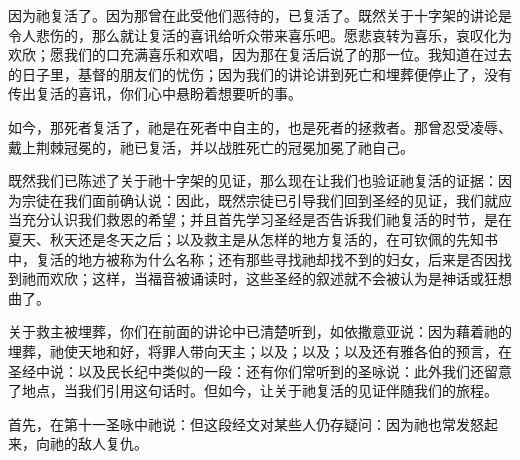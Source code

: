 \par

因为祂复活了。因为那曾在此受他们恶待的，已复活了。既然关于十字架的讲论是令人悲伤的，那么就让复活的喜讯给听众带来喜乐吧。愿悲哀转为喜乐，哀叹化为欢欣；愿我们的口充满喜乐和欢唱，因为那在复活后说了的那一位。我知道在过去的日子里，基督的朋友们的忧伤；因为我们的讲论讲到死亡和埋葬便停止了，没有传出复活的喜讯，你们心中悬盼着想要听的事。\newline{}\par

如今，那死者复活了，祂是在死者中自主的，也是死者的拯救者。那曾忍受凌辱、戴上荆棘冠冕的，祂已复活，并以战胜死亡的冠冕加冕了祂自己。\par

既然我们已陈述了关于祂十字架的见证，那么现在让我们也验证祂复活的证据：因为宗徒在我们面前确认说：因此，既然宗徒已引导我们回到圣经的见证，我们就应当充分认识我们救恩的希望；并且首先学习圣经是否告诉我们祂复活的时节，是在夏天、秋天还是冬天之后；以及救主是从怎样的地方复活的，在可钦佩的先知书中，复活的地方被称为什么名称；还有那些寻找祂却找不到的妇女，后来是否因找到祂而欢欣；这样，当福音被诵读时，这些圣经的叙述就不会被认为是神话或狂想曲了。\par

关于救主被埋葬，你们在前面的讲论中已清楚听到，如依撒意亚说：因为藉着祂的埋葬，祂使天地和好，将罪人带向天主；以及；以及；以及还有雅各伯的预言，在圣经中说：以及民长纪中类似的一段：还有你们常听到的圣咏说：此外我们还留意了地点，当我们引用这句话时。但如今，让关于祂复活的见证伴随我们的旅程。\par

首先，在第十一圣咏中祂说：但这段经文对某些人仍存疑问：因为祂也常发怒起来，向祂的敌人复仇。\par

